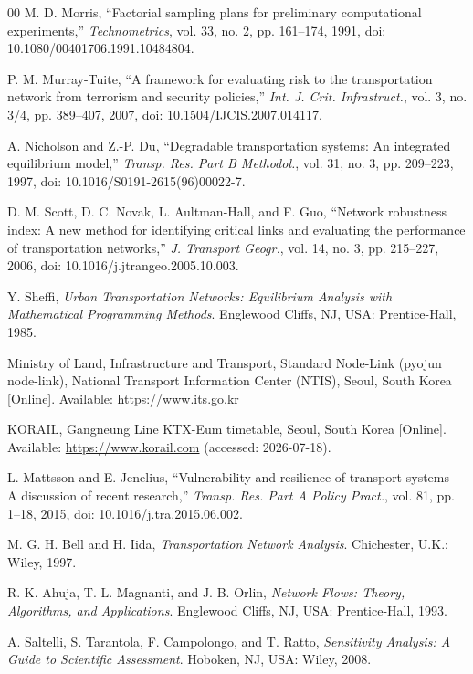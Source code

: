 \documentclass{ieeeaccess}
\begin{document}
\begin{thebibliography}{00}
 M. D. Morris, ``Factorial sampling plans for preliminary computational experiments,'' \emph{Technometrics}, vol. 33, no. 2, pp. 161--174, 1991, doi: 10.1080/00401706.1991.10484804.

 P. M. Murray-Tuite, ``A framework for evaluating risk to the transportation network from terrorism and security policies,'' \emph{Int. J. Crit. Infrastruct.}, vol. 3, no. 3/4, pp. 389--407, 2007, doi: 10.1504/IJCIS.2007.014117.

 A. Nicholson and Z.-P. Du, ``Degradable transportation systems: An integrated equilibrium model,'' \emph{Transp. Res. Part B Methodol.}, vol. 31, no. 3, pp. 209--223, 1997, doi: 10.1016/S0191-2615(96)00022-7.

 D. M. Scott, D. C. Novak, L. Aultman-Hall, and F. Guo, ``Network robustness index: A new method for identifying critical links and evaluating the performance of transportation networks,'' \emph{J. Transport Geogr.}, vol. 14, no. 3, pp. 215--227, 2006, doi: 10.1016/j.jtrangeo.2005.10.003.

 Y. Sheffi, \emph{Urban Transportation Networks: Equilibrium Analysis with Mathematical Programming Methods}. Englewood Cliffs, NJ, USA: Prentice-Hall, 1985.

 Ministry of Land, Infrastructure and Transport, Standard Node-Link (pyojun node-link), National Transport Information Center (NTIS), Seoul, South Korea [Online]. Available: \underline{https://www.its.go.kr}

 KORAIL, Gangneung Line KTX-Eum timetable, Seoul, South Korea [Online]. Available: \underline{https://www.korail.com} (accessed: 2026-07-18).

 L. Mattsson and E. Jenelius, ``Vulnerability and resilience of transport systems---A discussion of recent research,'' \emph{Transp. Res. Part A Policy Pract.}, vol. 81, pp. 1--18, 2015, doi: 10.1016/j.tra.2015.06.002.

 M. G. H. Bell and H. Iida, \emph{Transportation Network Analysis}. Chichester, U.K.: Wiley, 1997.

 R. K. Ahuja, T. L. Magnanti, and J. B. Orlin, \emph{Network Flows: Theory, Algorithms, and Applications}. Englewood Cliffs, NJ, USA: Prentice-Hall, 1993.

 A. Saltelli, S. Tarantola, F. Campolongo, and T. Ratto, \emph{Sensitivity Analysis: A Guide to Scientific Assessment}. Hoboken, NJ, USA: Wiley, 2008.


\end{thebibliography}
\end{document}

